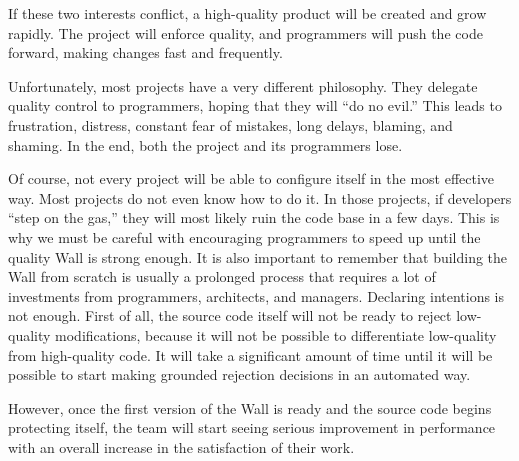 \documentclass{main}
\begin{document}
If these two interests conflict, a high-quality product will be created and grow rapidly. The project will enforce quality, and programmers will
push the code forward, making changes fast and frequently.

Unfortunately, most projects have a very different philosophy. They delegate
quality control to programmers, hoping that they will ``do no evil.'' This leads to
frustration, distress, constant fear of mistakes, long delays, blaming, and shaming.
In the end, both the project and its programmers lose.

Of course, not every project will be able to configure itself in the most
effective way. Most projects do not even know how to do it. In those projects, if
developers ``step on the gas,'' they will most likely ruin the code base in a
few days. This is why we must be careful with encouraging programmers to speed up
until the quality Wall is strong enough. It is also important to remember
that building the Wall from scratch is usually a prolonged process that requires
a lot of investments from programmers, architects, and managers.
Declaring intentions is not enough. First of all, the
source code itself will not be ready to reject low-quality modifications, because
it will not be possible to differentiate low-quality from high-quality code. It will
take a significant amount of time until it will be possible to start making
grounded rejection decisions in an automated way.

However, once the first version of the Wall is ready
and the source code begins protecting itself, the team will start
seeing serious improvement in performance with an overall increase in the satisfaction of their work.
\end{document}
